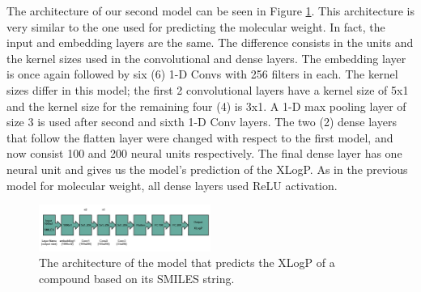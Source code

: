     The  architecture of our second model can be seen in Figure \ref{fig:xlogp-archi1}. This architecture  is very similar to the one used for predicting the molecular weight. In fact, the input and embedding layers are the same. The difference consists in the units and the kernel sizes used in the convolutional and dense layers. The embedding layer is once again followed by six (6) 1-D Convs with 256 filters in each.
    The kernel sizes differ in this model; the first 2 convolutional layers have a kernel size of 5x1 and the kernel size for the remaining four (4)  is 3x1. A 1-D max pooling layer of size 3 is used after second and sixth 1-D Conv layers. The two (2) dense layers that follow the flatten layer 
    were changed with respect to the first model, and  now consist  100 and 200 neural units respectively. The final dense layer has one neural unit and gives us the model's prediction of the XLogP. As in the previous model for molecular weight, all dense layers used ReLU activation. 
    
        \begin{figure}[htbp]
        \centering
        \includegraphics[width=0.5\textwidth]{figures/XLogP-model_arquitecture.jpg}
        \caption{The architecture of the model that predicts the XLogP of a compound based on its SMILES string.}
        \label{fig:xlogp-archi1}
    \end{figure}
  

